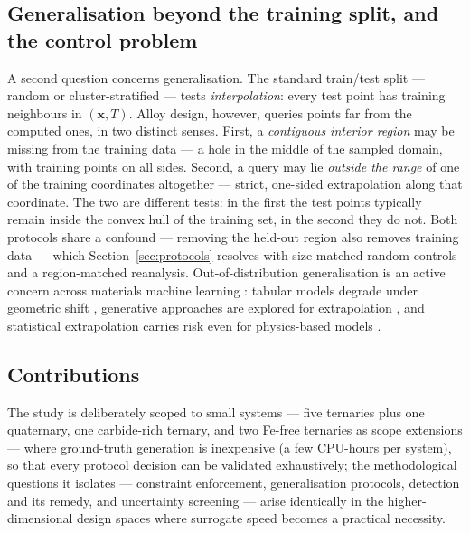 \documentclass[preprint,12pt,authoryear]{elsarticle}
\begin{document}
\subsection{Generalisation beyond the training split, and the control
problem}

A second question concerns generalisation. The standard train/test split ---
random or cluster-stratified --- tests \emph{interpolation}: every test point
has training neighbours in $(\mathbf{x}, T)$. Alloy design, however, queries
points far from the computed ones, in two distinct senses. First, a
\emph{contiguous interior region} may be missing from the training data ---
a hole in the middle of the sampled domain, with training points on all
sides. Second, a query may lie \emph{outside the range} of one of the training
coordinates altogether --- strict, one-sided extrapolation along that
coordinate. The two are
different tests: in the first the test points typically remain inside the
convex hull of the training set, in the second they do not. Both protocols
share a confound --- removing the held-out region also removes training
data --- which Section~\ref{sec:protocols} resolves with size-matched
random controls and a region-matched reanalysis. Out-of-distribution
generalisation is an active concern across materials machine learning
\citep{li2025ood,segal2025ood}: tabular models degrade under geometric
shift \citep{lix2025transfer}, generative approaches are explored for
extrapolation \citep{hatakeyama2021generative}, and statistical
extrapolation carries risk even for physics-based models
\citep{speckhard2025extrapolation}.

\subsection{Contributions}

The study is deliberately scoped to small systems --- five ternaries plus
one quaternary, one carbide-rich ternary, and two Fe-free ternaries as
scope extensions --- where
ground-truth generation is inexpensive (a few CPU-hours per system), so
that every protocol decision can be validated exhaustively; the
methodological questions it isolates --- constraint enforcement,
generalisation protocols, detection and its remedy, and uncertainty
screening --- arise identically in the higher-dimensional design spaces
where surrogate speed becomes a practical necessity.
\end{document}
